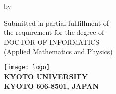 \documentclass[../main]{subfiles}
\begin{document}
\begin{titlepage}

    \centering
    \vspace*{1cm}

    \Large

    \textbf{ \uppercase\expandafter{\TheTitle}}

    {\large \textbf{\TheSubTitle}}

    \vspace{2cm}

    by

    \vspace{3mm}

    \textbf{\uppercase\expandafter{\TheAuthor}}

    \vspace{2cm}

    {\large
        Submitted in partial fullfillment of \\
        the requirement for the degree of \\
        DOCTOR OF INFORMATICS \\
        (Applied Mathematics and Physics)
    }

    \vspace{2cm}

    \texttt{[image: logo]}\\

    \textbf{
        KYOTO UNIVERSITY \\ \vspace{1mm}
        KYOTO 606-8501, JAPAN \\ \vspace{1mm}
        \uppercase\expandafter{\TheDate}
    }

\end{titlepage}
\end{document}

